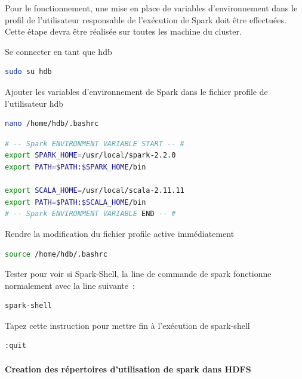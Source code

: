 \documentclass[12pt,english]{book}
\begin{document}
Pour le fonctionnement, une mise en place de variables d’environnement dans le profil de l’utilisateur responsable de l’exécution de Spark doit être effectuées.
Cette étape devra être réalisée sur toutes les machine du cluster.

Se connecter en tant que hdb

\begin{lstlisting}[language=bash, frame=single, basicstyle=\footnotesize]
sudo su hdb
\end{lstlisting}

Ajouter les variables d’environnement de Spark dans le fichier profile de l’utilisateur hdb

\begin{lstlisting}[language=bash, frame=single, basicstyle=\footnotesize]
nano /home/hdb/.bashrc
\end{lstlisting}

\begin{lstlisting}[language=bash, frame=single, basicstyle=\footnotesize]
# -- Spark ENVIRONMENT VARIABLE START -- #
export SPARK_HOME=/usr/local/spark-2.2.0
export PATH=$PATH:$SPARK_HOME/bin

export SCALA_HOME=/usr/local/scala-2.11.11
export PATH=$PATH:$SCALA_HOME/bin
# -- Spark ENVIRONMENT VARIABLE END -- #
\end{lstlisting}

Rendre la modification du fichier profile active immédiatement

\begin{lstlisting}[language=bash, frame=single, basicstyle=\footnotesize]
source /home/hdb/.bashrc
\end{lstlisting}

Tester pour voir si Spark-Shell, la line de commande de spark fonctionne normalement avec la line suivante :

\begin{lstlisting}[language=bash, frame=single, basicstyle=\footnotesize]
spark-shell
\end{lstlisting}

Tapez cette instruction pour mettre fin à l'exécution de spark-shell

\begin{lstlisting}[language=bash, frame=single, basicstyle=\footnotesize]
:quit
\end{lstlisting}

\paragraph{Creation des répertoires d’utilisation de spark dans HDFS}\mbox{}\\
\end{document}
